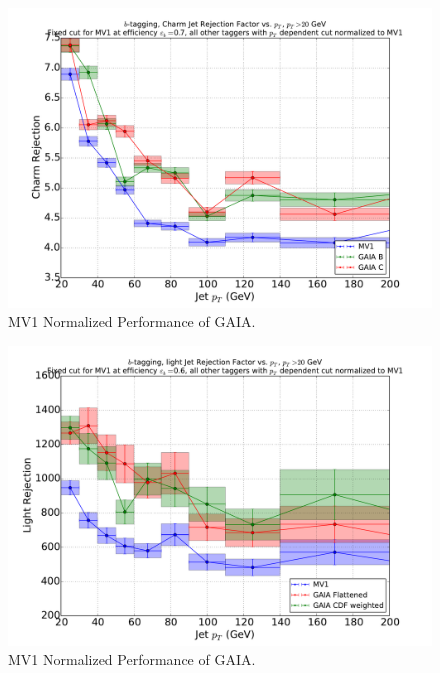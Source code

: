 \begin{figure}[h]
\includegraphics[width=\textwidth]{figures/btag/c_rej_mv1normalized_pTdep_70pct.pdf}
\caption[The ATLAS detector]{MV1 Normalized Performance of GAIA.
\label{fig:crejmv1norm60}}
\end{figure}


\begin{figure}[h]
\includegraphics[width=\textwidth]{figures/btag/u_rej_mv1normalized_pTdep_60pct.pdf}
\caption[The ATLAS detector]{MV1 Normalized Performance of GAIA.
\label{fig:urejmv1norm60}}
\end{figure}

